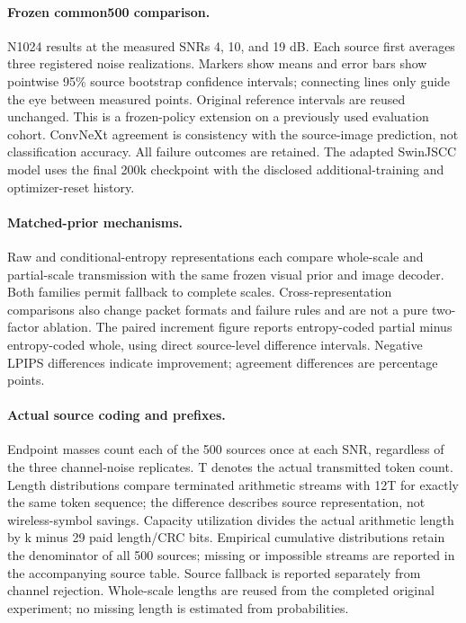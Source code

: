 \paragraph{Frozen common500 comparison.} N1024 results at the measured SNRs 4, 10, and 19 dB. Each source first averages three registered noise realizations. Markers show means and error bars show pointwise 95\% source bootstrap confidence intervals; connecting lines only guide the eye between measured points. Original reference intervals are reused unchanged. This is a frozen-policy extension on a previously used evaluation cohort. ConvNeXt agreement is consistency with the source-image prediction, not classification accuracy. All failure outcomes are retained. The adapted SwinJSCC model uses the final 200k checkpoint with the disclosed additional-training and optimizer-reset history.

\paragraph{Matched-prior mechanisms.} Raw and conditional-entropy representations each compare whole-scale and partial-scale transmission with the same frozen visual prior and image decoder. Both families permit fallback to complete scales. Cross-representation comparisons also change packet formats and failure rules and are not a pure two-factor ablation. The paired increment figure reports entropy-coded partial minus entropy-coded whole, using direct source-level difference intervals. Negative LPIPS differences indicate improvement; agreement differences are percentage points.

\paragraph{Actual source coding and prefixes.} Endpoint masses count each of the 500 sources once at each SNR, regardless of the three channel-noise replicates. T denotes the actual transmitted token count. Length distributions compare terminated arithmetic streams with 12T for exactly the same token sequence; the difference describes source representation, not wireless-symbol savings. Capacity utilization divides the actual arithmetic length by k minus 29 paid length/CRC bits. Empirical cumulative distributions retain the denominator of all 500 sources; missing or impossible streams are reported in the accompanying source table. Source fallback is reported separately from channel rejection. Whole-scale lengths are reused from the completed original experiment; no missing length is estimated from probabilities.
